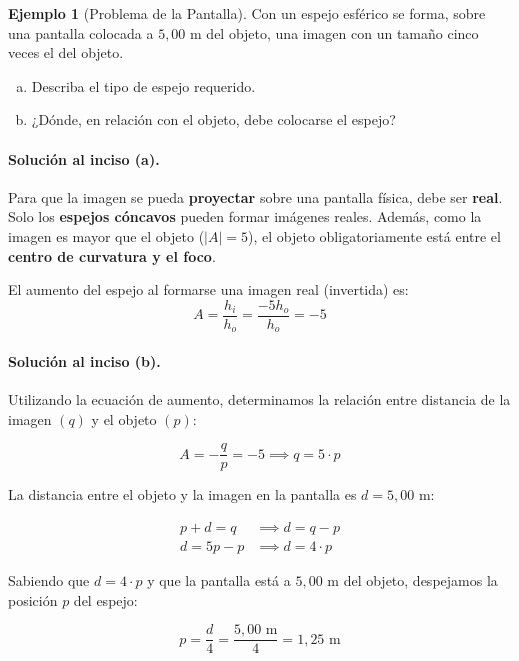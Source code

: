 \documentclass[12pt, a4paper]{article}
\theoremstyle{definition}
\newtheorem{ejemplo}{Ejemplo}[section]
\begin{document}
\begin{ejemplo}[Problema de la Pantalla]
Con un espejo esférico se forma, sobre una pantalla colocada a \(5{,}00\) m del objeto, una imagen con un tamaño cinco veces el del objeto.

\begin{enumerate}[(a)]
  \item Describa el tipo de espejo requerido.
  \item ¿Dónde, en relación con el objeto, debe colocarse el espejo?
\end{enumerate}
\end{ejemplo}

\paragraph{Solución al inciso (a).}
Para que la imagen se pueda \textbf{proyectar} sobre una pantalla física, debe ser \textbf{real}. Solo los \textbf{espejos cóncavos} pueden formar imágenes reales. Además, como la imagen es mayor que el objeto (\(|A| = 5\)), el objeto obligatoriamente está entre el \textbf{centro de curvatura y el foco}.

El aumento del espejo al formarse una imagen real (invertida) es:
\[
  A = \frac{h_i}{h_o} = \frac{-5h_o}{h_o} = -5
\]

\paragraph{Solución al inciso (b).}
Utilizando la ecuación de aumento, determinamos la relación entre distancia de la imagen \((q)\) y el objeto \((p)\):

\begin{equation}
  A = -\frac{q}{p} = -5 \implies q = 5 \cdot p
  \label{eq:pantalla1}
\end{equation}

La distancia entre el objeto y la imagen en la pantalla es \(d = 5{,}00\) m:

\begin{align}
  p + d = q &\implies d = q - p \nonumber \\
  d = 5p - p &\implies d = 4 \cdot p \label{eq:pantalla2}
\end{align}

Sabiendo que \(d = 4 \cdot p\) y que la pantalla está a \(5{,}00\) m del objeto, despejamos la posición \(p\) del espejo:

\begin{equation}
  p = \frac{d}{4} = \frac{5{,}00 \text{ m}}{4} = 1{,}25 \text{ m}
  \label{eq:pantalla_p}
\end{equation}
\end{document}

